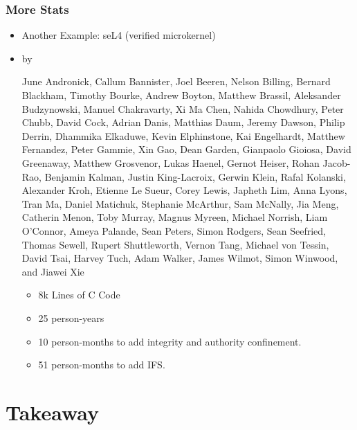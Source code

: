 \documentclass[aspectratio=169,t]{beamer}
\begin{document}
\begin{frame}
	\frametitle{More Stats}
	\vspace*{5ex}
	\begin{itemize}
		\item Another Example: seL4 (verified microkernel)
		\item<2-> by {\baselineskip-10pt\fontsize{3}{6} \selectfont June Andronick, Callum Bannister, Joel Beeren, Nelson Billing, Bernard Blackham, Timothy Bourke, Andrew Boyton, Matthew Brassil, Aleksander Budzynowski, Manuel Chakravarty, Xi Ma Chen, Nahida Chowdhury, Peter Chubb, David Cock, Adrian Danis, Matthias Daum, Jeremy Dawson, Philip Derrin, Dhammika Elkaduwe, Kevin Elphinstone, Kai Engelhardt, Matthew Fernandez, Peter Gammie, Xin Gao, Dean Garden, Gianpaolo Gioiosa, David Greenaway, Matthew Grosvenor, Lukas Haenel, Gernot Heiser, Rohan Jacob-Rao, Benjamin Kalman, Justin King-Lacroix, Gerwin Klein, Rafal Kolanski, Alexander Kroh, Etienne Le Sueur, Corey Lewis, Japheth Lim, Anna Lyons, Tran Ma, Daniel Matichuk, Stephanie McArthur, Sam McNally, Jia Meng, Catherin Menon, Toby Murray, Magnus Myreen, Michael Norrish, Liam O'Connor, Ameya Palande, Sean Peters, Simon Rodgers, Sean Seefried, Thomas Sewell, Rupert Shuttleworth, Vernon Tang, Michael von Tessin, David Tsai, Harvey Tuch, Adam Walker, James Wilmot, Simon Winwood, and Jiawei Xie\par}
		\begin{itemize}
			\item<3-> 8k Lines of C Code
			\item<4-> 25 person-years
			\item<5-> 10 person-months to add integrity and authority confinement.
			\item<5-> 51 person-months to add IFS.
		\end{itemize}
	\end{itemize}
\end{frame}


\section{Takeaway}
\end{document}
